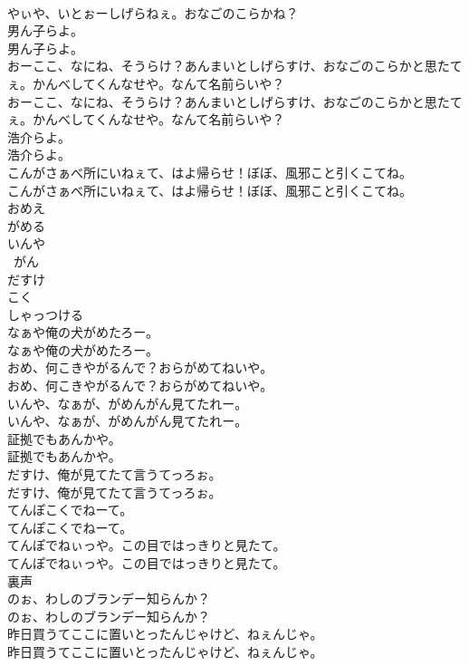 \documentclass[8pt]{extreport}
\begin{document}
\begin{CJK}{UTF8}{min}
\\	やぃや、いとぉーしげらねぇ。おなごのこらかね？ 
\\	男ん子らよ。	
\\	男ん子らよ。 
\\	おーここ、なにね、そうらけ？あんまいとしげらすけ、おなごのこらかと思たてぇ。かんべしてくんなせや。なんて名前らいや？	
\\	おーここ、なにね、そうらけ？あんまいとしげらすけ、おなごのこらかと思たてぇ。かんべしてくんなせや。なんて名前らいや？ 
\\	浩介らよ。	
\\	浩介らよ。 
\\	こんがさぁべ所にいねぇて、はよ帰らせ！ぼぼ、風邪こと引くこてね。	
\\	こんがさぁべ所にいねぇて、はよ帰らせ！ぼぼ、風邪こと引くこてね。 
\\	おめえ
\\	がめる
\\	いんや
\\	~がん
\\	だすけ
\\	こく
\\	しゃっつける
\\	なぁや俺の犬がめたろー。	
\\	なぁや俺の犬がめたろー。 
\\	おめ、何こきやがるんで？おらがめてねいや。	
\\	おめ、何こきやがるんで？おらがめてねいや。 
\\	いんや、なぁが、がめんがん見てたれー。	
\\	いんや、なぁが、がめんがん見てたれー。 
\\	証拠でもあんかや。	
\\	証拠でもあんかや。 
\\	だすけ、俺が見てたて言うてっろぉ。	
\\	だすけ、俺が見てたて言うてっろぉ。 
\\	てんぽこくでねーて。	
\\	てんぽこくでねーて。 
\\	てんぽでねぃっや。この目ではっきりと見たて。	
\\	てんぽでねぃっや。この目ではっきりと見たて。 
\\	裏声
\\	のぉ、わしのブランデー知らんか？	
\\	のぉ、わしのブランデー知らんか？ 
\\	昨日買うてここに置いとったんじゃけど、ねぇんじゃ。	
\\	昨日買うてここに置いとったんじゃけど、ねぇんじゃ。 

\end{CJK}
\end{document}

